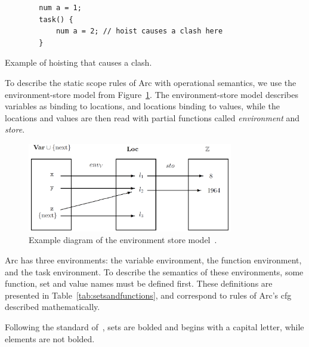 \begin{listing}[htb!]
  \begin{verbatim}
        num a = 1;
        task() {
            num a = 2; // hoist causes a clash here
        }
    \end{verbatim}
  \caption{Example of hoisting that causes a clash.}
  \label{lst:hoistclash}
\end{listing}


To describe the static scope rules of Arc with operational semantics, we use the environment-store model from Figure~\ref{fig:envstomodel}. The environment-store model describes variables as binding to locations, and locations binding to values, while the locations and values are then read with partial functions called \textit{environment} and \textit{store}.


\begin{figure}[htb!]
  \centering
  \includegraphics[width=0.8\textwidth]{figures/Environment_Store.png}
  \caption{Example diagram of the environment store model~\cite{Huttel2010}.}
  \label{fig:envstomodel}
\end{figure}


Arc has three environments: the variable environment, the function environment, and the task environment. To describe the semantics of these environments, some function, set and value names must be defined first. These definitions are presented in Table~\ref{tab:setsandfunctions}, and correspond to rules of Arc's \gls{cfg} described mathematically.

Following the standard of~\cite{Huttel2010}, sets are bolded and begins with a capital letter, while elements are not bolded.


